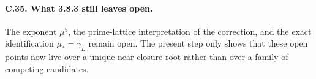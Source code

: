 \paragraph{C.35. What 3.8.3 still leaves open.}
The exponent \(\mu^5\), the prime-lattice interpretation of the correction, and the exact identification \(\mu_\ast=\gamma_L\) remain open. The present step only shows that these open points now live over a unique near-closure root rather than over a family of competing candidates.



